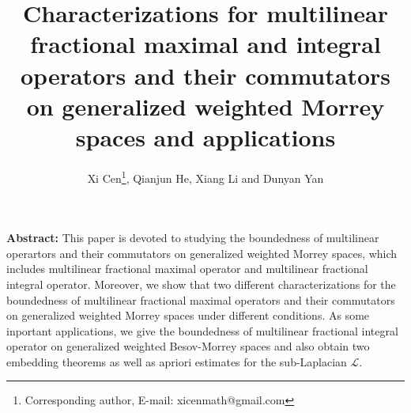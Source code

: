 \documentclass[11pt, twoside, leqno]{article}
\begin{document}
	\def\rn{{\mathbb R^n}}  \def\sn{{\mathbb S^{n-1}}}
	\def\co{{\mathcal C_\Omega}}
	\def\z{{\mathbb Z}}
	\def\nm{{\mathbb (\rn)^m}}
	\def\mm{{\mathbb (\rn)^{m+1}}}
	\def\n{{\mathbb N}}
	\def\cc{{\mathbb C}}
	
	\newtheorem{defn}{Definition}[section]
	\newtheorem{thm}{Theorem}[section]
	\newtheorem{lem}{Lemma}[section]
	\newtheorem{cor}{Corollary}[section]
	\newtheorem{rem}{Remark}[section]
	\newtheorem{pro}{Proposition}[section]
	\newtheorem{que}{Question}
	
	\renewcommand{\theequation}{\arabic{section}.\arabic{equation}}

	\title
{\bf\Large Characterizations for multilinear fractional maximal and integral operators and their commutators on generalized weighted Morrey spaces and applications
}
	
	\date{}
	\author{Xi Cen\footnote{Corresponding author, E-mail: xicenmath@gmail.com}, Qianjun He, Xiang Li and Dunyan Yan}
	\maketitle

\begin{center}
\begin{minipage}{13cm}
{\small {\bf Abstract:}\quad
This paper is devoted to studying the  boundedness of multilinear operartors and their commutators on generalized weighted Morrey spaces, which includes multilinear fractional maximal operator and multilinear fractional integral operator.  Moreover, we show that two different characterizations for the boundedness of multilinear fractional maximal operators and their commutators on generalized weighted Morrey spaces under different conditions. As some inportant applications, we give the boundedness of multilinear fractional integral operator on generalized weighted Besov-Morrey spaces and also obtain two embedding theorems as well as apriori estimates for the sub-Laplacian $\mathcal L$.}
\end{minipage}
\end{center}
\end{document}
